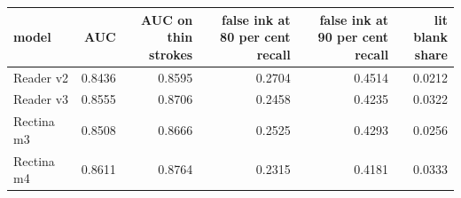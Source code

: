 {\small\setlength{\tabcolsep}{4pt}
\noindent\begin{tabular}{@{}lrrrrr@{}}
\hline
model & AUC & \shortstack{AUC on\\thin strokes} & \shortstack{false ink at\\80 per cent recall} & \shortstack{false ink at\\90 per cent recall} & \shortstack{lit blank\\share} \\
\hline
Reader v2 & 0.8436 & 0.8595 & 0.2704 & 0.4514 & 0.0212 \\
Reader v3 & 0.8555 & 0.8706 & 0.2458 & 0.4235 & 0.0322 \\
Rectina m3 & 0.8508 & 0.8666 & 0.2525 & 0.4293 & 0.0256 \\
Rectina m4 & 0.8611 & 0.8764 & 0.2315 & 0.4181 & 0.0333 \\
\hline
\end{tabular}}
